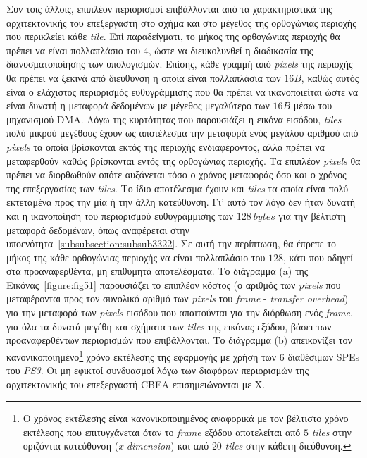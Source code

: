 Συν τοις άλλοις, επιπλέον περιορισμοί επιβάλλονται από τα χαρακτηριστικά της αρχιτεκτονικής του επεξεργαστή στο σχήμα και στο μέγεθος της ορθογώνιας περιοχής που περικλείει κάθε \textsl{tile}. Επί παραδείγματι, το μήκος της ορθογώνιας περιοχής θα πρέπει να είναι πολλαπλάσιο του \(4\), ώστε να διευκολυνθεί η διαδικασία της διανυσματοποίησης των υπολογισμών.\newline \indent 
Επίσης, κάθε γραμμή από \textsl{pixels} της περιοχής θα πρέπει να ξεκινά από διεύθυνση η οποία είναι πολλαπλάσια των \(16B\), καθώς αυτός είναι ο ελάχιστος περιορισμός ευθυγράμμισης που θα πρέπει να ικανοποιείται ώστε να είναι δυνατή η μεταφορά δεδομένων με μέγεθος μεγαλύτερο των \(16B\) μέσω του μηχανισμού \ac{DMA}.\newline \indent 
Λόγω της κυρτότητας που παρουσιάζει η εικόνα εισόδου, \textsl{tiles} πολύ μικρού μεγέθους έχουν ως αποτέλεσμα την μεταφορά ενός μεγάλου αριθμού από \textsl{pixels} τα οποία βρίσκονται εκτός της περιοχής ενδιαφέροντος, αλλά πρέπει να μεταφερθούν καθώς βρίσκονται εντός της ορθογώνιας περιοχής. Τα επιπλέον \textsl{pixels} θα πρέπει να διορθωθούν οπότε αυξάνεται τόσο ο χρόνος μεταφοράς όσο και ο χρόνος της επεξεργασίας των \textsl{tiles}.\newline \indent 
Το ίδιο αποτέλεσμα έχουν και \textsl{tiles} τα οποία είναι πολύ εκτεταμένα προς την μία ή την άλλη κατεύθυνση. Γι' αυτό τον λόγο δεν ήταν δυνατή και η ικανοποίηση του περιορισμού ευθυγράμμισης των \(128\ bytes\) για την βέλτιστη μεταφορά δεδομένων, όπως αναφέρεται στην υποενότητα~\ref{subsubsection:subsub3322}. Σε αυτή την περίπτωση, θα έπρεπε το μήκος της κάθε ορθογώνιας περιοχής να είναι πολλαπλάσιο του \(128\), κάτι που οδηγεί στα προαναφερθέντα, μη επιθυμητά αποτελέσματα.\newline
\indent
Το διάγραμμα (a) της Εικόνας~\ref{figure:fig51} παρουσιάζει το επιπλέον κόστος (ο αριθμός των \textsl{pixels} που μεταφέρονται προς τον συνολικό αριθμό των \textsl{pixels} του \textsl{frame} - \textsl{transfer overhead}) για την μεταφορά των \textsl{pixels} εισόδου που απαιτούνται για την διόρθωση ενός \textsl{frame}, για όλα τα δυνατά μεγέθη και σχήματα των \textsl{tiles} της εικόνας εξόδου, βάσει των προαναφερθέντων περιορισμών που επιβάλλονται. Το διάγραμμα (b) απεικονίζει τον κανονικοποιημένο\footnote{\small Ο χρόνος εκτέλεσης είναι κανονικοποιημένος αναφορικά με τον βέλτιστο χρόνο εκτέλεσης που επιτυγχάνεται όταν το \textsl{frame} εξόδου αποτελείται από \(5\) \textsl{tiles} στην οριζόντια κατεύθυνση (\textsl{x-dimension}) και από \(20\) \textsl{tiles} στην κάθετη διεύθυνση.} χρόνο εκτέλεσης της εφαρμογής με χρήση των \(6\) διαθέσιμων \acp{SPE} του \textsl{PS3}. Οι μη εφικτοί συνδυασμοί λόγω των διαφόρων περιορισμών της αρχιτεκτονικής του επεξεργαστή \ac{CBEA} επισημειώνονται με X.\newline \indent 
